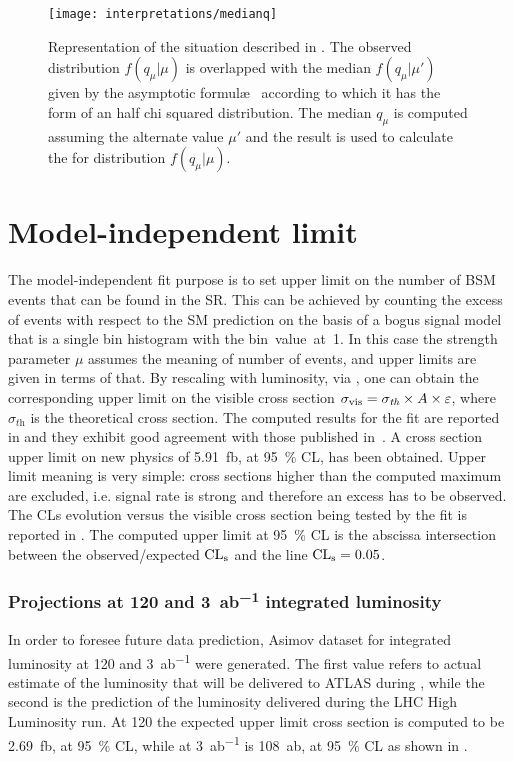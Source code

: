 \begin{figure}[pt]
\centering
\texttt{[image: interpretations/medianq]}
\caption{Representation of the situation described in \Sect{\ref{sec:sensitivity}}. The observed distribution $f(q_\mu \vert \mu)$ is overlapped with the median $f(q_\mu \vert \mu')$ given by the asymptotic formul\ae~ according to which it has the form of an half chi squared distribution. The median $q_\mu$ is computed assuming the alternate value $\mu'$ and the result is used to calculate the \p for distribution $f(q_\mu \vert \mu)$.}
\label{fig:medianq}
\end{figure}

\section{Model-independent limit}


The model-independent fit purpose is to set upper limit on the number of BSM events that can be found in the SR. This can be achieved by counting the excess of events with respect to the SM prediction on the basis of a bogus signal model that is a single bin histogram with the \mbox{bin value at 1.} In this case the strength parameter $\mu$ assumes the meaning of number of events, and upper limits are given in terms of that. By rescaling with luminosity, via \Eqn{\ref{eqn:Nevents}}, one can obtain the corresponding upper limit on the visible cross section $\sigma_\textup{vis}=\sigma_\textit{th}\times A\times\epsilon$, where $\sigma_\textit{th}$ is the theoretical cross section. The computed results for the fit are reported in \Tab{\ref{table.results.exclxsec.pval.upperlimit.SR}} and they exhibit good agreement with those published in~\cite{paperMP}. A cross section upper limit on new physics of \SI{5.91}{fb}, at \SI{95}{\percent} CL, has been obtained. Upper limit meaning is very simple: cross sections higher than the computed maximum are excluded, i.e. signal rate is strong and therefore an excess has to be observed. The CLs evolution versus the visible cross section being tested by the fit is reported in \Fig{\ref{fig:cls}}. The computed upper limit at \SI{95}{\percent} CL is the abscissa intersection between the observed/expected $\cls$ and the line $\cls=0.05$.





\subsubsection{Projections at \SI{120}{\ifb} and \SI{3}{ab^{-1}} integrated luminosity}
 In order to foresee future data prediction, Asimov dataset for integrated luminosity at \SI{120}{\ifb} and \SI{3}{ab^{-1}} were generated. The first value refers to actual estimate of the luminosity that will be delivered to ATLAS during \RunTwo, while the second is the prediction of the luminosity delivered during the LHC High Luminosity run. At \SI{120}{\ifb} the expected upper limit cross section is computed to be \SI{2.69}{fb}, at \SI{95}{\percent} CL, while at \SI{3}{ab^{-1}} is \SI{108}{ab}, at \SI{95}{\percent} CL as shown in \Tab{\ref{table.results.exclxsec.pval.upperlimit.SR}}.

